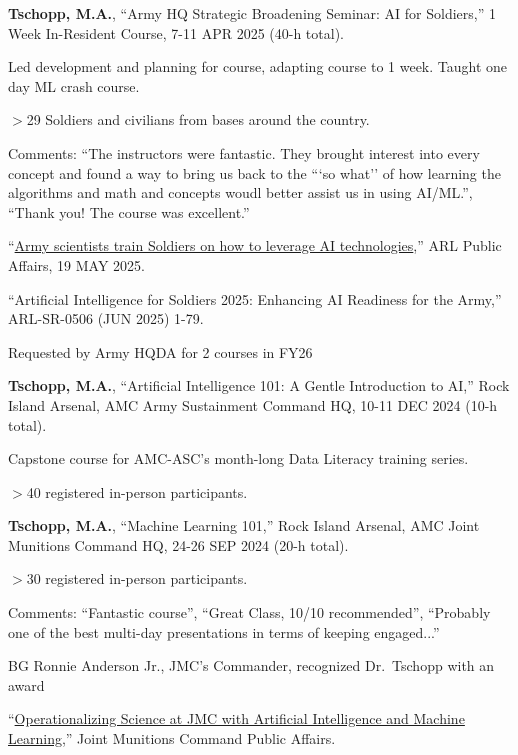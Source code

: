 \begin{cvlist}
\item
\textbf{Tschopp, M.A.}, ``Army HQ Strategic Broadening Seminar: AI for Soldiers,'' 1 Week In-Resident Course, 7-11 APR 2025 (40-h total).
\begin{list2}
\item[$\star$] Led development and planning for course, adapting course to 1 week.  Taught one day ML crash course.
\item[$\star$] $>$29 Soldiers and civilians from bases around the country.
\item[$\star$] Comments: ``The instructors were fantastic.  They brought interest into every concept and found a way to bring us back to the ```so what'' of how learning the algorithms and math and concepts woudl better assist us in using AI/ML.'', ``Thank you! The course was excellent.''
\item[$\star$] ``\href{https://www.army.mil/article/285626/army_scientists_train_soldiers_on_how_to_leverage_ai_technologies}{Army scientists train Soldiers on how to leverage AI technologies},'' ARL Public Affairs, 19 MAY 2025.
\item[$\star$] ``Artificial Intelligence for Soldiers 2025: Enhancing AI Readiness for the Army,'' ARL-SR-0506 (JUN 2025) 1-79.
\item[$\star$] Requested by Army HQDA for 2 courses in FY26
\end{list2}

\item
\textbf{Tschopp, M.A.}, ``Artificial Intelligence 101: A Gentle Introduction to AI,'' Rock Island Arsenal, AMC Army Sustainment Command HQ, 10-11 DEC 2024 (10-h total).
\begin{list2}
\item[$\star$] Capstone course for AMC-ASC's month-long Data Literacy training series.
\item[$\star$] $>$40 registered in-person participants.
\end{list2}

\item
\textbf{Tschopp, M.A.}, ``Machine Learning 101,'' Rock Island Arsenal, AMC Joint Munitions Command HQ, 24-26 SEP 2024 (20-h total).
\begin{list2}
\item[$\star$] $>$30 registered in-person participants.
\item[$\star$] Comments: ``Fantastic course'', ``Great Class, 10/10 recommended'', ``Probably one of the best multi-day presentations in terms of keeping engaged...''
\item[$\star$] BG Ronnie Anderson Jr., JMC's Commander, recognized Dr.~Tschopp with an award
\item[$\star$] ``\href{https://www.dvidshub.net/news/484157/operationalizing-science-jmc-with-artificial-intelligence-and-machine-learning}{Operationalizing Science at JMC with Artificial Intelligence and Machine Learning},'' Joint Munitions Command Public Affairs.
\end{list2}


\end{cvlist}
